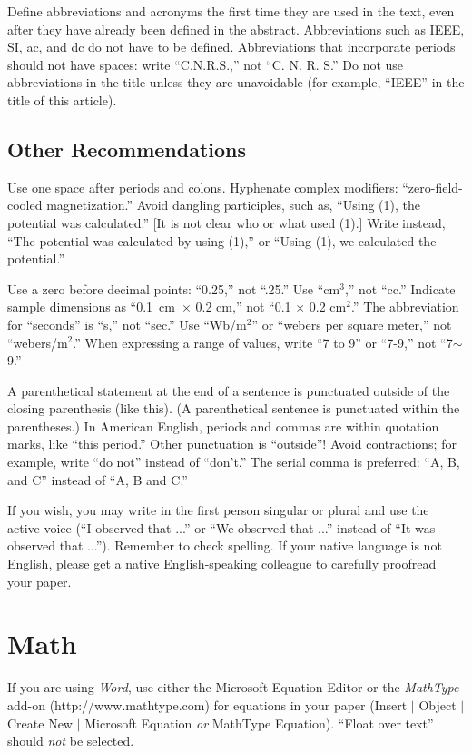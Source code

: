 \documentclass[journal]{IEEEtai}
\begin{document}
Define abbreviations and acronyms the first time they are used in the text, even after they have already been defined in the abstract. Abbreviations such as IEEE, SI, ac, and dc do not have to be defined. Abbreviations that incorporate periods should not have spaces: write ``C.N.R.S.,'' not ``C. N. R. S.'' Do not use abbreviations in the title unless they are unavoidable (for example, ``IEEE'' in the title of this article).

\subsection{Other Recommendations}

Use one space after periods and colons. Hyphenate complex modifiers: ``zero-field-cooled magnetization.'' Avoid dangling participles, such as, ``Using (1), the potential was calculated.'' [It is not clear who or what used (1).] Write instead, ``The potential was calculated by using (1),'' or ``Using (1), we calculated the potential.''

Use a zero before decimal points: ``0.25,'' not ``.25.'' Use ``cm$^3$,'' not ``cc.'' Indicate sample dimensions as ``0.1~cm~$\times$ 0.2 cm,'' not ``0.1 $\times$ 0.2 cm$^2$.'' The abbreviation for ``seconds'' is ``s,'' not ``sec.'' Use ``Wb/m$^2$'' or ``webers per square meter,'' not ``webers/m$^2$.'' When expressing a range of values, write ``7 to 9'' or ``7-9,'' not ``7$\sim$9.''

A parenthetical statement at the end of a sentence is punctuated outside of the closing parenthesis (like this). (A parenthetical sentence is punctuated within the parentheses.) In American English, periods and commas are within quotation marks, like ``this period.'' Other punctuation is ``outside''$!$ Avoid contractions; for example, write ``do not'' instead of ``don't.'' The serial comma is preferred: ``A, B, and C'' instead of ``A, B and C.''

If you wish, you may write in the first person singular or plural and use the active voice (``I observed that ...'' or ``We observed that ...'' instead of ``It was observed that ...''). Remember to check spelling. If your native language is not English, please get a native English-speaking colleague to carefully proofread your paper.

\section{Math}

If you are using {\it Word}, use either the Microsoft Equation Editor or the {\it MathType} add-on (http://www.mathtype.com) for equations in your paper (Insert $|$ Object $|$ Create New $|$ Microsoft Equation {\it or} MathType Equation). ``Float over text'' should {\it not} be selected.
\end{document}
